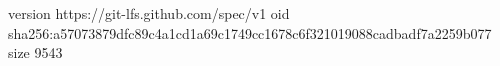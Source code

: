 version https://git-lfs.github.com/spec/v1
oid sha256:a57073879dfc89c4a1cd1a69c1749cc1678c6f321019088cadbadf7a2259b077
size 9543
